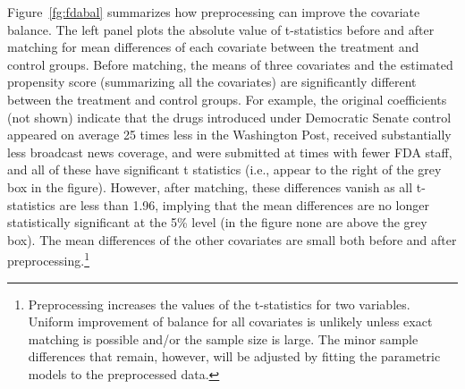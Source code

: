 \documentclass[11pt,titlepage]{article}
\begin{document}
Figure~\ref{fg:fdabal} summarizes how preprocessing can improve the
covariate balance. The left panel plots the absolute value of
t-statistics before and after matching for mean differences of each
covariate between the treatment and control groups.  Before matching,
the means of three covariates and the estimated propensity score
(summarizing all the covariates) are significantly different between
the treatment and control groups.  For example, the original
coefficients (not shown) indicate that the drugs introduced under
Democratic Senate control appeared on average 25 times less in the
Washington Post, received substantially less broadcast news coverage,
and were submitted at times with fewer FDA staff, and all of these
have significant t statistics (i.e., appear to the right of the grey
box in the figure).  However, after matching, these differences vanish
as all t-statistics are less than 1.96, implying that the mean
differences are no longer statistically significant at the 5\% level
(in the figure none are above the grey box).  The mean differences of
the other covariates are small both before and after
preprocessing.\footnote{Preprocessing increases the values of the
  t-statistics for two variables. Uniform improvement of balance for
  all covariates is unlikely unless exact matching is possible and/or
  the sample size is large. The minor sample differences that remain,
  however, will be adjusted by fitting the parametric models to the
  preprocessed data.}
\end{document}
